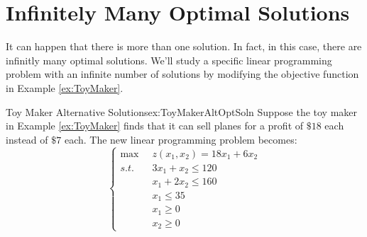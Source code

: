 \section{Infinitely Many Optimal Solutions}
It can happen that there is more than one solution.  In fact, in this case, there are infinitly many optimal solutions.  
We'll study a specific linear programming problem with an infinite number of solutions by modifying the objective function in Example \ref{ex:ToyMaker}. 
\begin{example}{Toy Maker Alternative Solutions}{ex:ToyMakerAltOptSoln}
Suppose the toy maker in Example \ref{ex:ToyMaker} finds that it can sell planes for a profit of $\$18$ each instead of $\$7$ each. The new linear programming problem becomes:
\begin{equation}
\left\{
\begin{aligned}
\max\;\;& z(x_1,x_2) = 18x_1 + 6x_2\\
s.t.\;\;&  3x_1 + x_2 \leq 120\\
& x_1 + 2x_2 \leq 160\\
& x_1 \leq 35\\
& x_1 \geq 0\\
& x_2 \geq 0
\end{aligned}
\right.
\label{eqn:ToyMakerAltOptSoln}
\end{equation}
\end{example}

